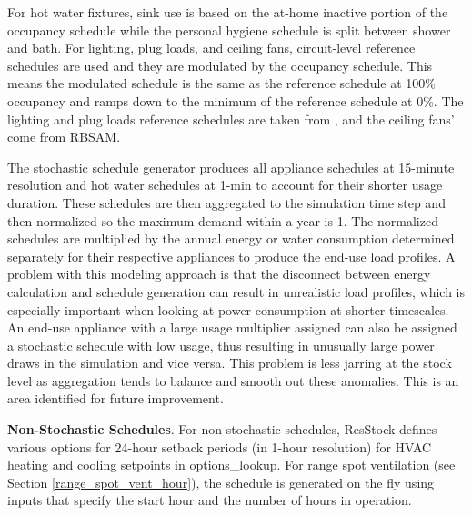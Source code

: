 For hot water fixtures, sink use is based on the at-home inactive portion of the occupancy schedule while the personal hygiene schedule is split between shower and bath. For lighting, plug loads, and ceiling fans, circuit-level reference schedules are used and they are modulated by the occupancy schedule. This means the modulated schedule is the same as the reference schedule at 100\% occupancy and ramps down to the minimum of the reference schedule at 0\%. The lighting and plug loads reference schedules are taken from \citet{Wilson2014}, and the ceiling fans' come from RBSAM.

The stochastic schedule generator produces all appliance schedules at 15-minute resolution and hot water schedules at 1-min to account for their shorter usage duration. These schedules are then aggregated to the simulation time step and then normalized so the maximum demand within a year is 1. The normalized schedules are multiplied by the annual energy or water consumption determined separately for their respective appliances to produce the end-use load profiles. A problem with this modeling approach is that the disconnect between energy calculation and schedule generation can result in unrealistic load profiles, which is especially important when looking at power consumption at shorter timescales. An end-use appliance with a large usage multiplier assigned can also be assigned a stochastic schedule with low usage, thus resulting in unusually large power draws in the simulation and vice versa. This problem is less jarring at the stock level as aggregation tends to balance and smooth out these anomalies. This is an area identified for future improvement.


\textbf{Non-Stochastic Schedules}. For non-stochastic schedules, ResStock defines various options for 24-hour setback periods (in 1-hour resolution) for HVAC heating and cooling setpoints in options\_lookup. For range spot ventilation (see Section  \ref{range_spot_vent_hour}), the schedule is generated on the fly using inputs that specify the start hour and the number of hours in operation.

